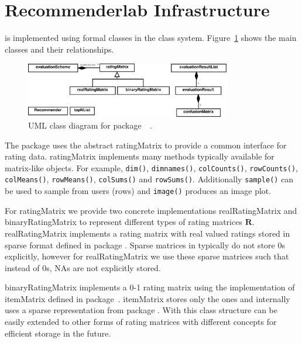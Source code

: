 \documentclass[nojss]{jss}
\newcommand{\class}[1]{\mbox{\textsf{#1}}}
\newcommand{\func}[1]{\mbox{\texttt{#1()}}}
\newcommand{\mat}[1]{{\mathbf{#1}}}
\begin{document}
\section{Recommenderlab Infrastructure}
\label{sec:infrastructure}
 is implemented using formal classes in 
the  class system. 
Figure~\ref{fig:class_diagram} shows the main classes and their relationships. 

\begin{figure}
\centerline{\includegraphics[width=0.8\textwidth]{recommenderlab_classes}}
\caption{UML class diagram for 
package~~\citep{misc:Fowler:2004}.}
\label{fig:class_diagram}
\end{figure}

The package uses the abstract \class{ratingMatrix} 
to provide a common interface for rating data. \class{ratingMatrix}
implements many methods typically available for matrix-like
objects. For example, \func{dim}, \func{dimnames}, 
\func{colCounts}, \func{rowCounts},
\func{colMeans}, \func{rowMeans},
\func{colSums} and \func{rowSums}.
Additionally \func{sample} can be used to sample from users (rows) and
\func{image} produces an image plot.

For \class{ratingMatrix} we provide two concrete 
implementations \class{realRatingMatrix} and 
\class{binaryRatingMatrix} to represent different types of rating 
matrices $\mat{R}$.
\class{realRatingMatrix} implements a rating matrix with real valued 
ratings stored in sparse format defined in package .
Sparse matrices in  typically do not store 0s explicitly,
however for \class{realRatingMatrix} we use these sparse matrices
such that instead of 0s, NAs are not explicitly stored.

\class{binaryRatingMatrix} implements a 0-1 rating matrix using the
implementation of \class{itemMatrix} defined in package~.
\class{itemMatrix} stores only the ones and internally uses a sparse
representation from package .  With this class structure
 can be easily extended to other forms of rating matrices
with different concepts for efficient storage in the future.
\end{document}
